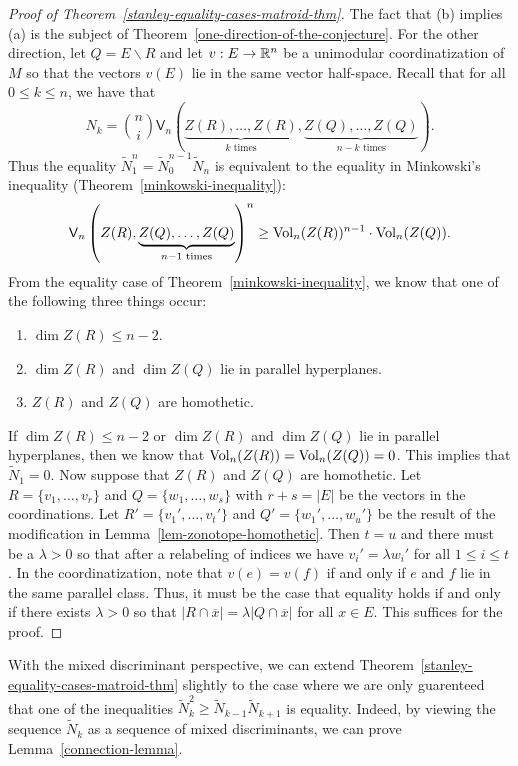 \documentclass{puthesis-UG}
\begin{document}
\begin{proof}[Proof of Theorem~\ref{stanley-equality-cases-matroid-thm}]
	The fact that (b) implies (a) is the subject of Theorem~\ref{one-direction-of-the-conjecture}. For the other direction, let $Q = E \backslash R$ and let $v : E \to \mathbb{R}^n$ be a unimodular coordinatization of $M$ so that the vectors $v(E)$ lie in the same vector half-space. Recall that for all $0 \leq k \leq n$, we have that 
	\[
		N_k = \binom{n}{i} \mathsf{V}_n \left ( \underbrace{Z(R), \ldots, Z(R)}_{k \text{ times}}, \underbrace{Z(Q), \ldots, Z(Q)}_{n-k \text{ times}} \right ). 
	\]
	Thus the equality $\widetilde{N}_1^n = \widetilde{N}_0^{n-1} \widetilde{N}_n$ is equivalent to the equality in Minkowski's inequality (Theorem~\ref{minkowski-inequality}):
	\[
		\mathsf{V}_n \left ( Z(R), \underbrace{Z(Q), \ldots, Z(Q)}_{n-1 \text{ times}} \right )^n \geq \operatorname{Vol}_n (Z(R))^{n-1} \cdot \operatorname{Vol}_n(Z(Q)).
	\]
	From the equality case of Theorem~\ref{minkowski-inequality}, we know that one of the following three things occur:
	\begin{enumerate}[label = (\arabic*)]
		\item $\dim Z(R) \leq n-2$. 
		\item $\dim Z(R)$ and $\dim Z(Q)$ lie in parallel hyperplanes. 
		\item $Z(R)$ and $Z(Q)$ are homothetic. 
	\end{enumerate}
	If $\dim Z(R) \leq n-2$ or $\dim Z(R)$ and $\dim Z(Q)$ lie in parallel hyperplanes, then we know that $\operatorname{Vol}_n (Z(R)) = \operatorname{Vol}_n(Z(Q)) = 0$. This implies that $\widetilde{N}_1 = 0$. Now suppose that $Z(R)$ and $Z(Q)$ are homothetic. Let $R = \{v_1, \ldots, v_r\}$ and $Q = \{w_1, \ldots, w_s\}$ with $r + s = |E|$ be the vectors in the coordinations. Let $R' = \{v_1', \ldots, v_t'\}$ and $Q' =\{w_1', \ldots, w_u'\}$ be the result of the modification in Lemma~\ref{lem-zonotope-homothetic}. Then $t = u$ and there must be a $\lambda > 0$ so that after a relabeling of indices we have $v_i' = \lambda w_i'$ for all $1 \leq i \leq t$. In the coordinatization, note that $v(e) = v(f)$ if and only if $e$ and $f$ lie in the same parallel class. Thus, it must be the case that equality holds if and only if there exists $\lambda > 0$ so that $|R \cap \overline{x}| = \lambda |Q \cap \overline{x}|$ for all $x \in E$. This suffices for the proof. 
\end{proof}

With the mixed discriminant perspective, we can extend Theorem~\ref{stanley-equality-cases-matroid-thm} slightly to the case where we are only guarenteed that one of the inequalities $\widetilde{N}_k^2 \geq \widetilde{N}_{k-1} \widetilde{N}_{k+1}$ is equality. Indeed, by viewing the sequence $\widetilde{N}_k$ as a sequence of mixed discriminants, we can prove Lemma~\ref{connection-lemma}. 
\end{document}
